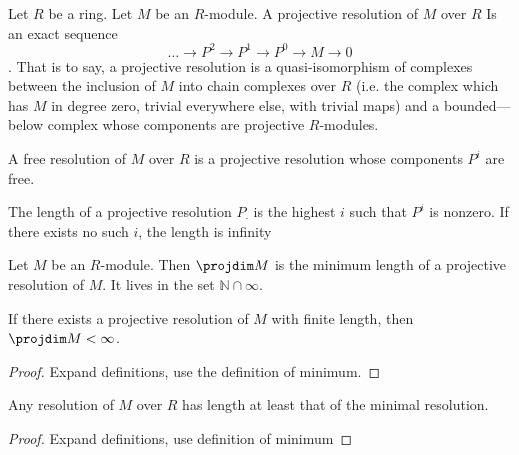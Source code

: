 \begin{definition}
  \label{def:projv_resl}
  Let $R$ be a ring. 
  Let $M$ be an $R$-module.
  A projective resolution of $M$ over $R$
  Is an exact sequence
  \[
    \ldots \to P^2 \to P^1 \to P^0 \to M \to 0
  \].
  That is to say, a projective resolution is a
  quasi-isomorphism of complexes between the 
  inclusion of $M$ into chain complexes over $R$
  (i.e. the complex which has $M$ in degree zero,
  trivial everywhere else, with trivial maps)
  and a bounded—below complex whose
  components are projective $R$-modules.
\end{definition}

\begin{definition}
  \label{def:free_resl}
  A free resolution of $M$ over $R$ is 
  a projective resolution whose components
  $P^i$ are free.
\end{definition}

\begin{definition}
  \label{def:length_of_resl}
  The length of a projective
  resolution $P_\cdot$ is 
  the highest $i$ such that $P^i$
  is nonzero.
  If there exists no such $i$, the
  length is infinity
\end{definition}

\begin{definition}
  \label{def:projdim}
  Let $M$ be an $R$-module. 
  Then $\projdim M$ is the minimum 
  length of a projective resolution of $M$.
  It lives in the set $\mathbb{N} \cap \infty$.
\end{definition}

\begin{lemma}
  \label{lem:finite_resl_implies_finite_projdim}
  If there exists a projective resolution of
  $M$ with finite length, then 
  $\projdim M < \infty$.
\end{lemma}

\begin{proof}
  Expand definitions, use the definition of minimum.
\end{proof}

\begin{lemma}
  \label{lem:min_resl_has_min_length}
  Any resolution of $M$ over $R$ has 
  length at least that of the minimal resolution.
\end{lemma}

\begin{proof}
  Expand definitions, use definition of minimum
\end{proof}

